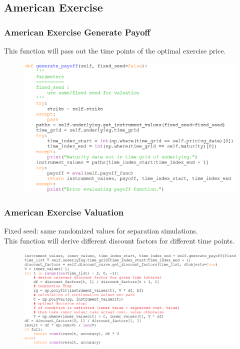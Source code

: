\documentclass{beamer}
\begin{document}
\subsection{American Exercise}
\begin{frame}
\frametitle{American Exercise Generate Payoff}
This function will pass out the time points of the optimal exercise price.
\begin{figure}[H]
	\includegraphics[scale=0.4]{american_generate_payoff.png}
\end{figure}
\end{frame}

\begin{frame}
\frametitle{American Exercise Valuation}
Fixed seed: same randomized values for separation simulations.\\
This function will derive different discount factors for different time points.
\begin{figure}[H]
	\includegraphics[scale=0.4]{american_present_value.png}
\end{figure}
\end{frame}
\end{document}
